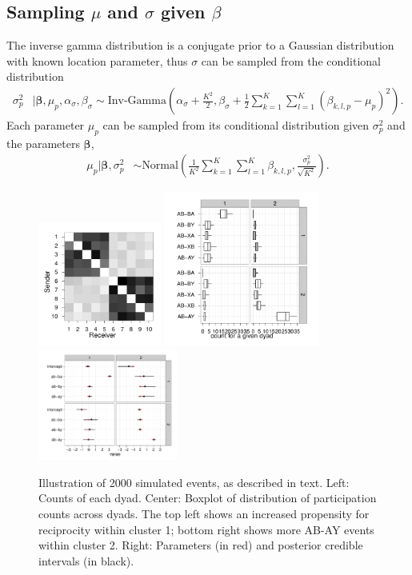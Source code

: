 \subsection{Sampling $\mu$  and $\sigma$ given $\beta$ }

The inverse gamma distribution is a conjugate prior to a Gaussian distribution with known location parameter, thus $\sigma$ can be sampled from the conditional distribution
\begin{align}
\label{eqn:gibbs.sigma}
\sigma_p^2 &| \boldsymbol{\beta}, \mu_p,  \alpha_{\sigma}, \beta_{\sigma} \sim
 \mbox{Inv-Gamma}\left(\alpha_{\sigma} + \frac{K^2}{2}, \beta_{\sigma} + \frac{1}{2} \sum_{k=1}^K\sum_{l=1}^K (\beta_{k,l,p} - \mu_p)^2\right).
\end{align}
Each parameter $\mu_p$ can be sampled from its conditional distribution given $\sigma_p^2$ and the parameters $\boldsymbol{\beta}$,
\begin{align}
\label{eqn:gibbs.mu}
\mu_p | \boldsymbol{\beta},\sigma_p^2 &\sim \mbox{Normal}\left(\frac{1}{K^2}\sum_{k=1}^K \sum_{l=1}^K \beta_{k,l,p},\frac{ \sigma_p^2}{\sqrt{K^2}}\right).
\end{align}

\begin{figure}
\center
\includegraphics[width=1.6in]{../figs/synthetic/mat.pdf}
\includegraphics[width=2in]{../figs/synthetic/counts.pdf}
\includegraphics[width=1.8in]{../figs/synthetic/params-estimates.pdf}
\caption{Illustration of 2000 simulated events, as described in text. Left: Counts of each dyad. Center: Boxplot of distribution of participation counts across dyads.  The top left shows an increased propensity for reciprocity within cluster 1; bottom right shows more AB-AY events within cluster 2.  Right: Parameters (in red) and posterior credible intervals (in black).}
\label{fig:syncounts}
\end{figure}

